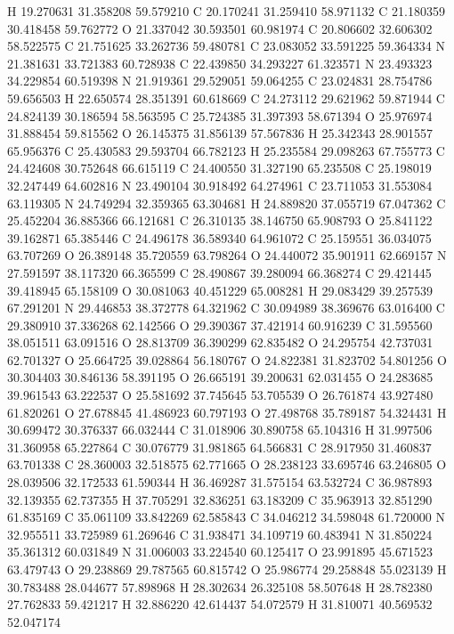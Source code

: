 \documentclass{article}
\begin{document}
H 19.270631 31.358208 59.579210
C 20.170241 31.259410 58.971132
C 21.180359 30.418458 59.762772
O 21.337042 30.593501 60.981974
C 20.806602 32.606302 58.522575
C 21.751625 33.262736 59.480781
C 23.083052 33.591225 59.364334
N 21.381631 33.721383 60.728938
C 22.439850 34.293227 61.323571
N 23.493323 34.229854 60.519398
N 21.919361 29.529051 59.064255
C 23.024831 28.754786 59.656503
H 22.650574 28.351391 60.618669
C 24.273112 29.621962 59.871944
C 24.824139 30.186594 58.563595
C 25.724385 31.397393 58.671394
O 25.976974 31.888454 59.815562
O 26.145375 31.856139 57.567836
H 25.342343 28.901557 65.956376
C 25.430583 29.593704 66.782123
H 25.235584 29.098263 67.755773
C 24.424608 30.752648 66.615119
C 24.400550 31.327190 65.235508
C 25.198019 32.247449 64.602816
N 23.490104 30.918492 64.274961
C 23.711053 31.553084 63.119305
N 24.749294 32.359365 63.304681
H 24.889820 37.055719 67.047362
C 25.452204 36.885366 66.121681
C 26.310135 38.146750 65.908793
O 25.841122 39.162871 65.385446
C 24.496178 36.589340 64.961072
C 25.159551 36.034075 63.707269
O 26.389148 35.720559 63.798264
O 24.440072 35.901911 62.669157
N 27.591597 38.117320 66.365599
C 28.490867 39.280094 66.368274
C 29.421445 39.418945 65.158109
O 30.081063 40.451229 65.008281
H 29.083429 39.257539 67.291201
N 29.446853 38.372778 64.321962
C 30.094989 38.369676 63.016400
C 29.380910 37.336268 62.142566
O 29.390367 37.421914 60.916239
C 31.595560 38.051511 63.091516
O 28.813709 36.390299 62.835482
O 24.295754 42.737031 62.701327
O 25.664725 39.028864 56.180767
O 24.822381 31.823702 54.801256
O 30.304403 30.846136 58.391195
O 26.665191 39.200631 62.031455
O 24.283685 39.961543 63.222537
O 25.581692 37.745645 53.705539
O 26.761874 43.927480 61.820261
O 27.678845 41.486923 60.797193
O 27.498768 35.789187 54.324431
H 30.699472 30.376337 66.032444
C 31.018906 30.890758 65.104316
H 31.997506 31.360958 65.227864
C 30.076779 31.981865 64.566831
C 28.917950 31.460837 63.701338
C 28.360003 32.518575 62.771665
O 28.238123 33.695746 63.246805
O 28.039506 32.172533 61.590344
H 36.469287 31.575154 63.532724
C 36.987893 32.139355 62.737355
H 37.705291 32.836251 63.183209
C 35.963913 32.851290 61.835169
C 35.061109 33.842269 62.585843
C 34.046212 34.598048 61.720000
N 32.955511 33.725989 61.269646
C 31.938471 34.109719 60.483941
N 31.850224 35.361312 60.031849
N 31.006003 33.224540 60.125417
O 23.991895 45.671523 63.479743
O 29.238869 29.787565 60.815742
O 25.986774 29.258848 55.023139
H 30.783488 28.044677 57.898968
H 28.302634 26.325108 58.507648
H 28.782380 27.762833 59.421217
H 32.886220 42.614437 54.072579
H 31.810071 40.569532 52.047174
\end{document}
